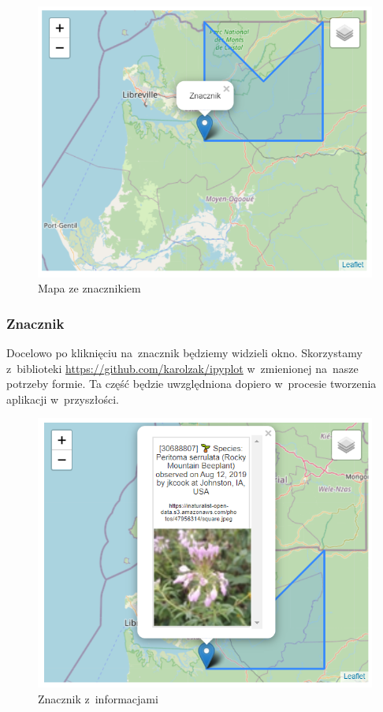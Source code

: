 \documentclass{article}
\begin{document}
\begin{figure}[h] 
\begin{center}
\includegraphics[scale = 0.55]{"znacznik.PNG"}
\end{center}
\caption{Mapa ze znacznikiem}
\label{}
\end{figure}

\subsubsection{Znacznik}
Docelowo po kliknięciu na~znacznik będziemy widzieli okno. Skorzystamy z~biblioteki \url{https://github.com/karolzak/ipyplot} w~zmienionej na~nasze potrzeby formie. Ta część będzie uwzględniona dopiero w~procesie tworzenia aplikacji w~przyszłości.

\begin{figure}[h] 
\begin{center}
\includegraphics[scale = 0.65]{"znacznikfoto.PNG"}
\end{center}
\caption{Znacznik z~informacjami}
\label{}
\end{figure}
\end{document}
